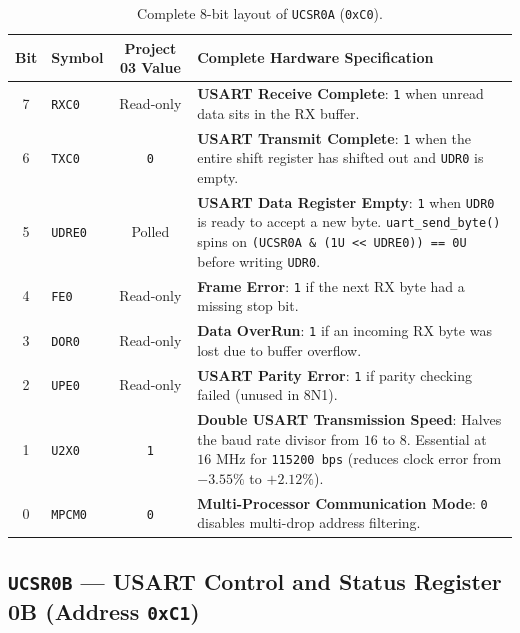 \documentclass[11pt,a4paper,oneside]{report}
\begin{document}
\begin{table}[!htbp]
\centering
\caption{Complete 8-bit layout of \texttt{UCSR0A} (\texttt{0xC0}).}
\label{tab:ch3_ucsr0a}
\begin{tabularx}{\linewidth}{c l c X}
\toprule
\textbf{Bit} & \textbf{Symbol} & \textbf{Project 03 Value} & \textbf{Complete Hardware Specification} \\
\midrule
7 & \texttt{RXC0} & Read-only & \textbf{USART Receive Complete}: \texttt{1} when unread data sits in the RX buffer. \\
6 & \texttt{TXC0} & \texttt{0} & \textbf{USART Transmit Complete}: \texttt{1} when the entire shift register has shifted out and \texttt{UDR0} is empty. \\
5 & \texttt{UDRE0} & Polled & \textbf{USART Data Register Empty}: \texttt{1} when \texttt{UDR0} is ready to accept a new byte. \texttt{uart\_send\_byte()} spins on \texttt{(UCSR0A \& (1U << UDRE0)) == 0U} before writing \texttt{UDR0}. \\
4 & \texttt{FE0} & Read-only & \textbf{Frame Error}: \texttt{1} if the next RX byte had a missing stop bit. \\
3 & \texttt{DOR0} & Read-only & \textbf{Data OverRun}: \texttt{1} if an incoming RX byte was lost due to buffer overflow. \\
2 & \texttt{UPE0} & Read-only & \textbf{USART Parity Error}: \texttt{1} if parity checking failed (unused in 8N1). \\
1 & \texttt{U2X0} & \texttt{1} & \textbf{Double USART Transmission Speed}: Halves the baud rate divisor from $16$ to $8$. Essential at $16\text{ MHz}$ for \texttt{115200 bps} (reduces clock error from $-3.55\%$ to $+2.12\%$). \\
0 & \texttt{MPCM0} & \texttt{0} & \textbf{Multi-Processor Communication Mode}: \texttt{0} disables multi-drop address filtering. \\
\bottomrule
\end{tabularx}
\end{table}

\subsection{\texttt{UCSR0B} --- USART Control and Status Register 0B (Address \texttt{0xC1})}
\end{document}
